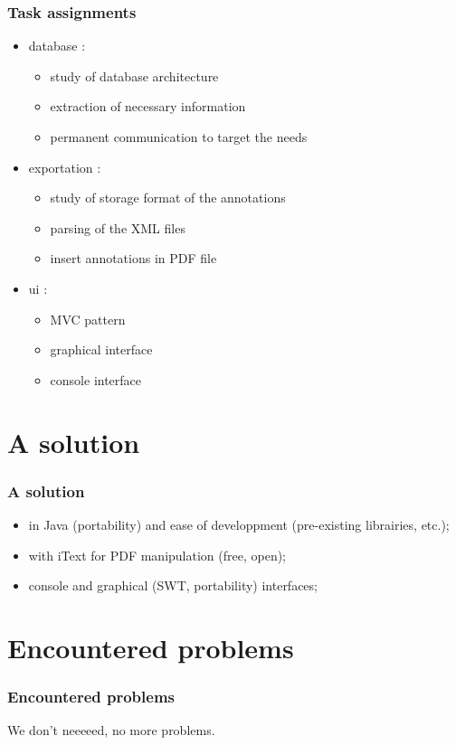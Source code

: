 \documentclass[t,12pt]{beamer}
\begin{document}
\begin{frame}
  \frametitle{Task assignments}
  \begin{itemize}
    \pause \item database :
	\begin{itemize}
		\item study of database architecture
		\item extraction of necessary information
		\item permanent communication to target the needs
	\end{itemize}
	\pause \item exportation :
	\begin{itemize}
		\item study of storage format of the annotations
		\item parsing of the XML files
		\item insert annotations in PDF file
	\end{itemize}
	\pause \item ui :
	\begin{itemize}
		\item MVC pattern
		\item graphical interface
		\item console interface
	\end{itemize}
  \end{itemize}
\end{frame}

\section{A solution}
\begin{frame}
  \frametitle{A solution}
  \begin{itemize}
    \item in Java (portability) and ease of developpment (pre-existing
      librairies, etc.);
    \pause \item with iText for PDF manipulation (free, open);
    \pause \item console and graphical (SWT, portability) interfaces;
  \end{itemize}
\end{frame}

\section{Encountered problems}
\begin{frame}
  \frametitle{Encountered problems}
  We don't neeeeed, no more problems.
\end{frame}
\end{document}
